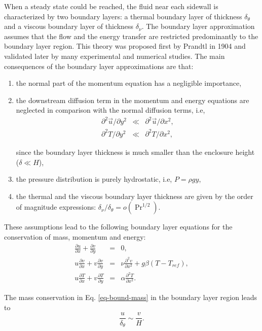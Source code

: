 When a steady state could be reached, the fluid near each sidewall is characterized by two boundary layers: a thermal boundary layer of thickness $\delta_{\theta}$ and a viscous boundary layer of thickness $\delta_\nu$.
The boundary layer approximation assumes that the flow and the energy transfer are restricted predominantly to the boundary layer region.
This theory was proposed first by Prandtl in 1904 and validated later by many experimental and numerical studies.
The main consequences of the boundary layer approximations are that:
\begin{enumerate}[label=(\roman*)]
\item the normal part of the momentum equation has a negligible importance,
\item the downstream diffusion term in the momentum and energy equations are neglected in comparison with the normal diffusion terms, i.e,
\begin{eqnarray}
\partial^2 \vec{u}/\partial y^2 & \ll & \partial^2 \vec{u}/\partial x^2, \\
\partial^2 T/\partial y^2 & \ll & \partial^2 T/\partial x^2,
\end{eqnarray}

\noindent since the boundary layer thickness is much smaller than the enclosure height ($ \delta \ll H$),
\item the pressure distribution is purely hydrostatic, i.e, $P = \rho g y$,
\item the thermal and the viscous boundary layer thickness are given by the order of magnitude expressions: $\delta_\nu/\delta_\theta = o \left(\Pr^{1/2} \right)$.
\end{enumerate}
These assumptions lead to the following boundary layer equations for the conservation of mass, momentum and energy:
\begin{eqnarray} \label{eq-bound-mass}
	\frac{\partial u}{\partial x} + \frac{\partial v}{\partial y} &=& 0, \\  \label{eq-bound-mom}
	u \frac{\partial v}{\partial x} + v \frac{\partial v}{\partial y} &=& \nu \frac{\partial^2 v}{\partial x^2} + g \beta (T - T_{ref}), \\ \label{eq-bound-energy}
	u \frac{\partial T}{\partial x} + v \frac{\partial T}{\partial y} &=& \alpha \frac{\partial^2 T}{\partial x^2}. 
\end{eqnarray}

\noindent The mass conservation in Eq. \ref{eq-bound-mass} in the boundary layer region leads to
\begin{equation}
	\frac{u}{\delta_\theta} \sim \frac{v}{H}.
\end{equation}

